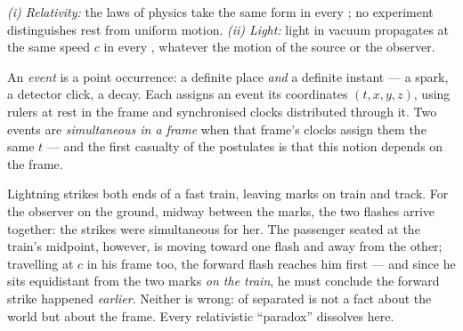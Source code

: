 \begin{theorem}\label{thm:b3:relativistic-kinematics:postulates}
\emph{(i) Relativity:} the laws of physics take the same form in every
; no experiment distinguishes rest from uniform motion.
\emph{(ii) Light:} light in vacuum propagates at the same speed $c$ in
every , whatever the motion of the source or the
observer.
\end{theorem}
\admitted

\begin{definition}\label{def:b3:relativistic-kinematics:event}
An \emph{event} is a point occurrence: a definite place \emph{and} a
definite instant --- a spark, a detector click, a decay. Each  assigns an event its coordinates $(t, x, y, z)$, using rulers at
rest in the frame and synchronised clocks distributed through it. Two
events are \emph{simultaneous in a frame} when that frame's clocks
assign them the same $t$ --- and the first casualty of the postulates
is that this notion depends on the frame.
\end{definition}

\begin{example}\label{ex:b3:relativistic-kinematics:train}
Lightning strikes both ends of a fast train, leaving marks on train
and track. For the observer on the ground, midway between the marks,
the two flashes arrive together: the strikes were simultaneous for
her. The passenger seated at the train's midpoint, however, is moving
toward one flash and away from the other; travelling at $c$ in his
frame too, the forward flash reaches him first --- and since he sits
equidistant from the two marks \emph{on the train}, he must conclude
the forward strike happened \emph{earlier}. Neither is wrong:
 of separated  is not a fact about the world but
about the frame. Every relativistic ``paradox'' dissolves here.
\end{example}

